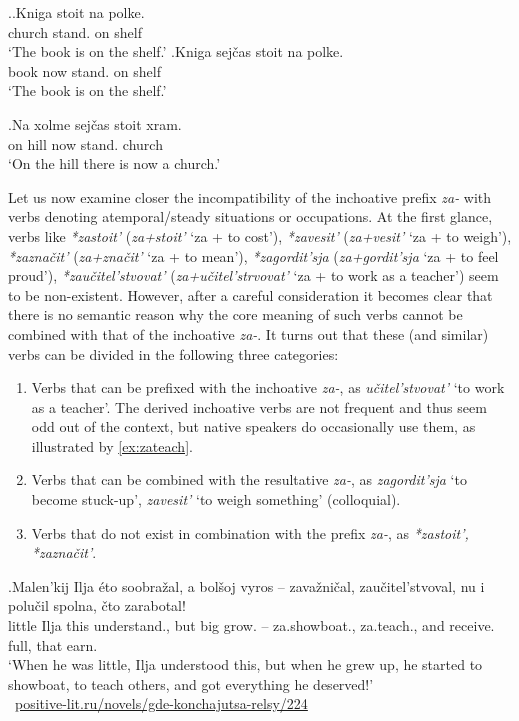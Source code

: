 \ex.\label{ex:stojat':kniga}\ag.Kniga stoit na polke.\\
church stand. on shelf\\
\trans `The book is on the shelf.'
\bg.Kniga sej\v{c}as stoit na polke.\\
book now stand. on shelf\\
\trans `The book is on the shelf.'

\exg.\label{ex:stojat':xram3}Na xolme sej\v{c}as stoit xram.\\
on hill now stand. church\\
\trans `On the hill there is now a church.'

Let us now examine closer the incompatibility of the inchoative prefix \textit{za-} with verbs denoting atemporal/steady situations or occupations. At the first glance, verbs like \textit{*zastoit'} (\textit{za+stoit'} `za + to cost'), \textit{*zavesit'} (\textit{za+vesit'} `za + to weigh'), \textit{*zazna\v{c}it'} (\textit{za+zna\v{c}it'} `za + to mean'), \textit{*zagordit'sja} (\textit{za+gordit'sja} `za + to feel proud'), \textit{*zau\v{c}itel'stvovat'} (\textit{za+u\v{c}itel'strvovat'} `za + to work as a teacher') seem to be non-existent. However, after a careful consideration it becomes clear that there is no semantic reason why the core meaning of such verbs cannot be combined with that of the inchoative \textit{za-}. It turns out that these (and similar) verbs can be divided in the following three categories:

\begin{enumerate}
\item Verbs that can be prefixed with the inchoative \textit{za-}, as \textit{u\v{c}itel'stvovat'} `to work as a teacher'. The derived inchoative verbs are not frequent and thus seem odd out of the context, but native speakers do occasionally use them, as illustrated by \ref{ex:zateach}.
\item Verbs that can be combined with the resultative \textit{za-}, as \textit{zagordit'sja} `to become stuck-up', \textit{zavesit'} `to weigh something' (colloquial).
\item Verbs that do not exist in combination with the prefix \textit{za-}, as \textit{*zastoit', *zazna\v{c}it'}.
\end{enumerate}

\exg.\label{ex:zateach}Malen'kij Ilja \'eto soobra\v{z}al, a bol\v{s}oj vyros -- zava\v{z}ni\v{c}al, zau\v{c}itel'stvoval, nu i polu\v{c}il spolna, \v{c}to zarabotal!\\
little Ilja this understand., but big grow. -- za.showboat., za.teach., {} and receive. full, that earn.\\
\trans `When he was little, Ilja understood this, but when he grew up, he started to showboat, to teach others, and got everything he deserved!'\\\hbox{}\hfill\hbox{
\url{positive-lit.ru/novels/gde-konchajutsa-relsy/224}}

